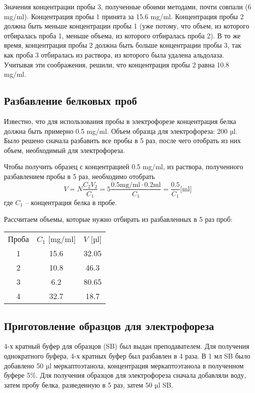 Значения концентрации пробы 3, полученные обоими методами, почти совпали (6 mg/ml).
Концентрация пробы 1 принята за 15.6 mg/ml.
Концентрация пробы 2 должна быть меньше концентрации пробы 1
(уже потому, что объем, из которого отбиралась проба 1,
меньше объема, из которого отбиралась проба 2).
В то же время, концентрация пробы 2 должна быть больше концентрации пробы 3,
так как проба 3 отбиралась из раствора, из которого была удалена альдолаза.
Учитывая эти соображения, решили, что концентрация пробы 2 равна 10.8 mg/ml.

\subsection{Разбавление белковых проб}
Известно, что для использования пробы в электрофорезе концентрация
белка должна быть примерно 0.5 mg/ml.
Объем образца для электрофореза: 200 µl.
Было решено сначала разбавить все пробы в 5 раз, после чего
отобрать из них объем, необходимый для электрофореза.

Чтобы получить образец с концентрацией 0.5 mg/ml,
из раствора, полученного разбавлением пробы в 5 раз,
необходимо отобрать
$$ V = N \frac{C_2 V_2}{C_1} = 5 \frac{0.5 \text{mg/ml} \cdot 0.2 \text{ml}}{C_1} = \frac{0.5}{C_1} \text{[ml]} $$
где $C_1$ -- концентрация белка в пробе.

Рассчитаем объемы, которые нужно отбирать из разбавленных в 5 раз проб:

\begin{tabular}{|c|c|c|}
\hline
Проба & $C_1$ [mg/ml] & $V$ [µl] \\
1 & 15.6  & 32.05 \\
2 & 10.8  & 46.3  \\
3 & 6.2   & 80.65 \\
4 & 32.7  & 18.7  \\
\hline
\end{tabular}

\subsection{Приготовление образцов для электрофореза}
4-х кратный буфер для образцов (SB) был выдан преподавателем.
Для получения однократного буфера, 4-х кратных буфер был разбавлен в 4 раза.
В 1 мл SB было добавлено 50 µl меркаптоэтанола,
концентрация меркаптоэтанола в полученном буфере 5\%.
Для получения образцов для электрофореза сначала добавляли воду,
затем пробу белка, разведенную в 5 раз, затем 50 µl SB.

